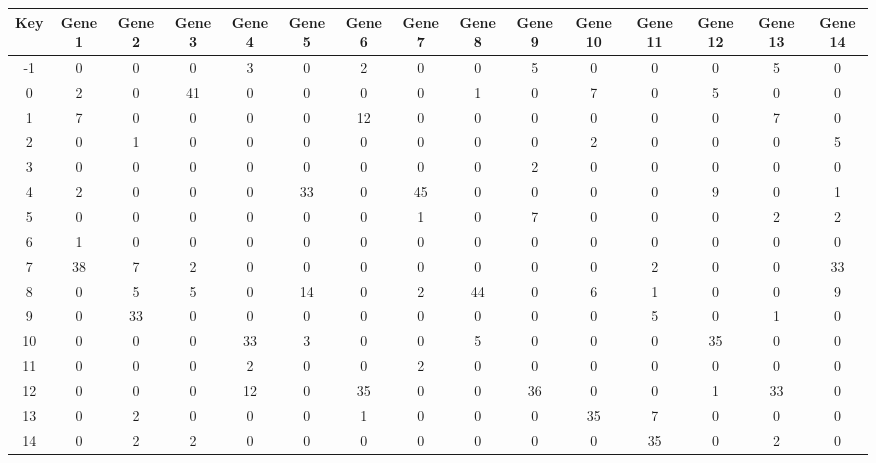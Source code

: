 \begin{tabular}{|c|c|c|c|c|c|c|c|c|c|c|c|c|c|c|}
\hline
Key & Gene 1 & Gene 2 & Gene 3 & Gene 4 & Gene 5 & Gene 6 & Gene 7 & Gene 8 & Gene 9 & Gene 10 & Gene 11 & Gene 12 & Gene 13 & Gene 14 \\
\hline
-1 & 0 & 0 & 0 & 3 & 0 & 2 & 0 & 0 & 5 & 0 & 0 & 0 & 5 & 0 \\
0 & 2 & 0 & 41 & 0 & 0 & 0 & 0 & 1 & 0 & 7 & 0 & 5 & 0 & 0 \\
1 & 7 & 0 & 0 & 0 & 0 & 12 & 0 & 0 & 0 & 0 & 0 & 0 & 7 & 0 \\
2 & 0 & 1 & 0 & 0 & 0 & 0 & 0 & 0 & 0 & 2 & 0 & 0 & 0 & 5 \\
3 & 0 & 0 & 0 & 0 & 0 & 0 & 0 & 0 & 2 & 0 & 0 & 0 & 0 & 0 \\
4 & 2 & 0 & 0 & 0 & 33 & 0 & 45 & 0 & 0 & 0 & 0 & 9 & 0 & 1 \\
5 & 0 & 0 & 0 & 0 & 0 & 0 & 1 & 0 & 7 & 0 & 0 & 0 & 2 & 2 \\
6 & 1 & 0 & 0 & 0 & 0 & 0 & 0 & 0 & 0 & 0 & 0 & 0 & 0 & 0 \\
7 & 38 & 7 & 2 & 0 & 0 & 0 & 0 & 0 & 0 & 0 & 2 & 0 & 0 & 33 \\
8 & 0 & 5 & 5 & 0 & 14 & 0 & 2 & 44 & 0 & 6 & 1 & 0 & 0 & 9 \\
9 & 0 & 33 & 0 & 0 & 0 & 0 & 0 & 0 & 0 & 0 & 5 & 0 & 1 & 0 \\
10 & 0 & 0 & 0 & 33 & 3 & 0 & 0 & 5 & 0 & 0 & 0 & 35 & 0 & 0 \\
11 & 0 & 0 & 0 & 2 & 0 & 0 & 2 & 0 & 0 & 0 & 0 & 0 & 0 & 0 \\
12 & 0 & 0 & 0 & 12 & 0 & 35 & 0 & 0 & 36 & 0 & 0 & 1 & 33 & 0 \\
13 & 0 & 2 & 0 & 0 & 0 & 1 & 0 & 0 & 0 & 35 & 7 & 0 & 0 & 0 \\
14 & 0 & 2 & 2 & 0 & 0 & 0 & 0 & 0 & 0 & 0 & 35 & 0 & 2 & 0 \\
\hline
\end{tabular}
